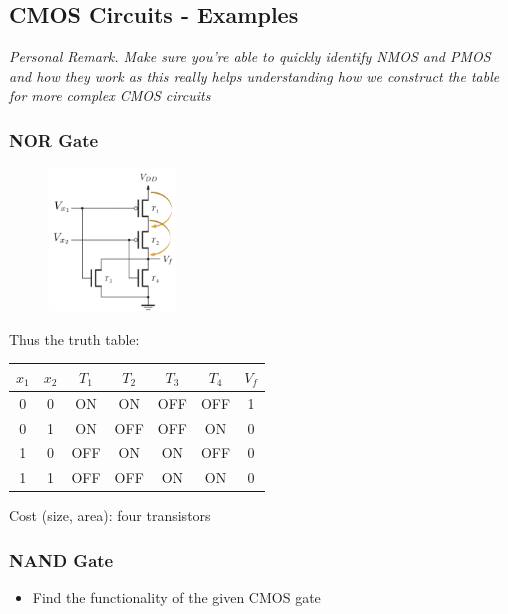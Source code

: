 \documentclass[12pt,openany, tikz,border=10pt]{book}
\begin{document}
\subsection{CMOS Circuits - Examples}
\textit{Personal Remark. Make sure you're able to quickly identify NMOS and PMOS and how they work as this really helps understanding how we construct the table for more complex CMOS circuits}
\subsubsection{NOR Gate}
\begin{figure}[h]
    \centering
    \includegraphics[width=0.3\textwidth]{circuits/9.1.5.png} %
    \end{figure}
 Thus the truth table: 
    \begin{center}
    \begin{tabular}{ |c|c||c|c|c|c||c| }
    \hline
    \( x_1 \) & \( x_2 \) & \( T_1 \) & \( T_2 \) & \( T_3 \) & \( T_4 \) & \( V_f \) \\
    \hline
    0 & 0 & ON & ON & OFF & OFF & 1 \\
    0 & 1 & ON & OFF & OFF & ON & 0 \\
    1 & 0 & OFF & ON & ON & OFF & 0 \\
    1 & 1 & OFF & OFF & ON & ON & 0 \\
    \hline
    \end{tabular}
    \end{center}

    Cost (size, area): four transistors

    \subsubsection{NAND Gate}
    \begin{itemize}
        \item Find the functionality of the given CMOS gate
      \end{itemize}
      
\end{document}
